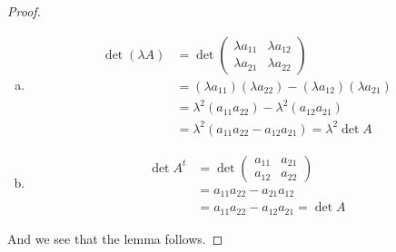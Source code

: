 \begin{proof}
\begin{enumerate}[a)]
		\item 
		\begin{align*}
			\det(\lambda A)&=\det\begin{pmatrix}
			\lambda a_{11}&\lambda a_{12}\\\lambda a_{21}&\lambda a_{22}
			\end{pmatrix}\\
			&=(\lambda a_{11})(\lambda a_{22})-(\lambda a_{12})(\lambda a_{21})\\
			&=\lambda^2(a_{11}a_{22})-\lambda^2(a_{12}a_{21})\\
			&=\lambda^2(a_{11}a_{22}-a_{12}a_{21})=\lambda^2\det A
		\end{align*}
		
		\item \begin{align*}
			\det A^t&=\det\begin{pmatrix}
			a_{11}&a_{21}\\a_{12}&a_{22}
			\end{pmatrix}\\
			&=a_{11}a_{22}-a_{21}a_{12}\\
			&=a_{11}a_{22}-a_{12}a_{21}=\det A
		\end{align*}
	\end{enumerate}

And we see that the lemma follows.
\end{proof}

